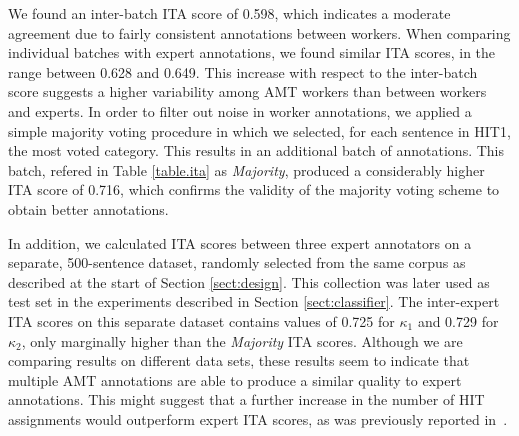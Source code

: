 \documentclass[11pt,letterpaper]{article}
\begin{document}
We found an inter-batch ITA score of 0.598, which indicates a moderate agreement due to fairly consistent annotations between workers. When comparing individual batches with expert annotations, we found similar ITA scores, in the range between 0.628 and 0.649. This increase with respect to the inter-batch score suggests a higher variability among AMT workers than between workers and experts. 
In order to filter out noise in worker annotations, we applied a simple majority voting procedure in which we selected, for each sentence in HIT1, the most voted category. This results in an additional batch of annotations. This batch, refered in Table \ref{table.ita} as \textit{Majority}, produced a considerably higher ITA score of 0.716, which confirms the validity of the majority voting scheme to obtain better annotations.

In addition, we calculated ITA scores between three expert annotators on a separate, 500-sentence dataset, randomly selected from the same corpus as described at the start of Section \ref{sect:design}. This collection was later used as test set in the experiments described in Section \ref{sect:classifier}. The inter-expert ITA scores on this separate dataset contains values of 0.725 for $\kappa_{1}$ and 0.729 for $\kappa_{2}$, only marginally higher than the \textit{Majority} ITA scores. Although we are comparing results on different data sets, these results seem to indicate that multiple AMT annotations are able to produce a similar quality to expert annotations. This might suggest that a further increase in the number of HIT assignments would outperform expert ITA scores, as was previously reported in~\cite{snow_cheap_2008}.

% 

\end{document}
